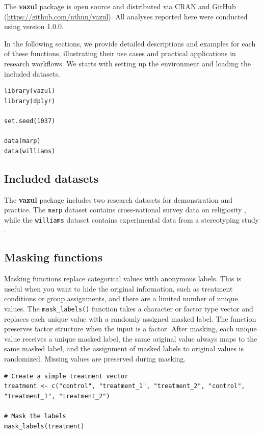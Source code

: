 The \textbf{vazul} package is open source and distributed via CRAN and GitHub (\url{https://github.com/nthun/vazul}). All analyses reported here were conducted using version 1.0.0.

In the following sections, we provide detailed descriptions and examples for each of these functions, illustrating their use cases and practical applications in research workflows. We starts with setting up the environment and loading the included datasets.

\begin{verbatim}
library(vazul)
library(dplyr)

set.seed(1037)

data(marp)
data(williams)
\end{verbatim}

\subsection{Included datasets}\label{included-datasets}

The \textbf{vazul} package includes two research datasets for demonstration and practice. The \texttt{marp} dataset contains cross-national survey data on religiosity \citep{MARP2022discussion}, while the \texttt{williams} dataset contains experimental data from a stereotyping study \citep{Sarafoglou2025-fr}.

\subsection{Masking functions}\label{masking-functions}

Masking functions replace categorical values with anonymous labels. This is useful when you want to hide the original information, such as treatment conditions or group assignments, and there are a limited number of unique values. The \texttt{mask\_labels()} function takes a character or factor type vector and replaces each unique value with a randomly assigned masked label. The function preserves factor structure when the input is a factor. After masking, each unique value receives a unique masked label, the same original value always maps to the same masked label, and the assignment of masked labels to original values is randomized. Missing values are preserved during masking.

\begin{verbatim}
# Create a simple treatment vector
treatment <- c("control", "treatment_1", "treatment_2", "control", "treatment_1", "treatment_2")

# Mask the labels
mask_labels(treatment)
\end{verbatim}

